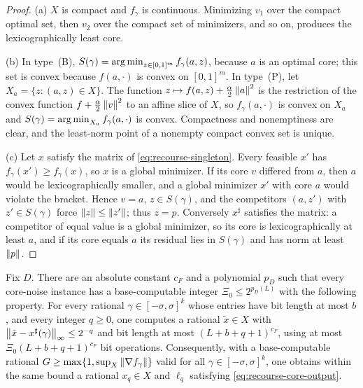 \begin{proof}
(a) $X$ is compact and $f_\gamma$ is continuous. Minimizing $v_1$ over
the compact optimal set, then $v_2$ over the compact set of minimizers,
and so on, produces the lexicographically least core.

(b) In type~(B), $S(\gamma)=\operatorname*{arg\,min}_{z\in[0,1]^m}f_\gamma(a,z)$, because
$a$ is an optimal core; this set is convex because $f(a,\cdot)$ is
convex on $[0,1]^m$. In type~(P), let $X_a=\{z:(a,z)\in X\}$. The
function $z\mapsto f(a,z)+\frac\alpha2\left\lVert a\right\rVert^2$ is the restriction of
the convex function $f+\frac\alpha2\left\lVert v\right\rVert^2$ to an affine slice of $X$,
so $f_\gamma(a,\cdot)$ is convex on $X_a$ and
$S(\gamma)=\operatorname*{arg\,min}_{X_a}f_\gamma(a,\cdot)$ is convex. Compactness and
nonemptiness are clear, and the least-norm point of a nonempty compact
convex set is unique.

(c) Let $x$ satisfy the matrix of \eqref{eq:recourse-singleton}. Every
feasible $x'$ has $f_\gamma(x')\ge f_\gamma(x)$, so $x$ is a global
minimizer. If its core $v$ differed from $a$, then $a$ would be
lexicographically smaller, and a global minimizer $x'$ with core $a$
would violate the bracket. Hence $v=a$, $z\in S(\gamma)$, and the
competitors $(a,z')$ with $z'\in S(\gamma)$ force
$\left\lVert z\right\rVert\le\left\lVert z'\right\rVert$; thus $z=p$. Conversely $x^\sharp$ satisfies the
matrix: a competitor of equal value is a global minimizer, so its core
is lexicographically at least $a$, and if its core equals $a$ its
residual lies in $S(\gamma)$ and has norm at least $\left\lVert p\right\rVert$.
\end{proof}

\begin{lemma}
\label{lem:recourse-fallback}
Fix $D$. There are an absolute constant $c_F$ and a polynomial $p_D$
such that every core-noise instance has a base-computable integer
$\Xi_0\le2^{p_D(L)}$ with the following property. For every rational
$\gamma\in[-\sigma,\sigma]^k$ whose entries have bit length at most
$b$, and every integer $q\ge0$, one computes a rational $\tilde x\in X$
with $\left\lVert\tilde x-x^\sharp(\gamma)\right\rVert_\infty\le2^{-q}$ and bit length
at most $(L+b+q+1)^{c_F}$, using at most $\Xi_0(L+b+q+1)^{c_F}$ bit
operations. Consequently, with a base-computable rational
$G\ge\max\{1,\sup_X\left\lVert\nabla f_\gamma\right\rVert\}$ valid for all
$\gamma\in[-\sigma,\sigma]^k$, one obtains within the same bound a
rational $x_q\in X$ and $\ell_q$ satisfying
\eqref{eq:recourse-core-output}.
\end{lemma}

